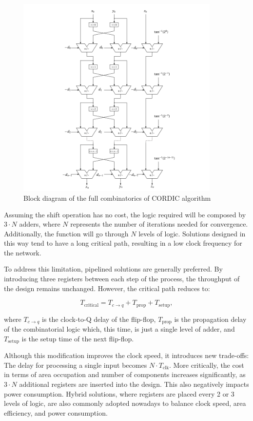 \begin{figure}[H]
    \centering
    \includegraphics[width=0.9\textwidth]{images/Architecture/pipelined_CORDIC.pdf}
    \caption{Block diagram of the full combinatorics of CORDIC algorithm}
    \label{fig:pipeline_CORDIC}
\end{figure}

Assuming the shift operation has no cost, the logic required will be composed by \(3 \cdot N\) adders, where \(N\) represents the number of iterations needed for convergence. Additionally, the function will go through \(N\) levels of logic. Solutions designed in this way tend to have a long critical path, resulting in a low clock frequency for the network.

To address this limitation, pipelined solutions are generally preferred. By introducing three registers between each step of the process, the throughput of the design remains unchanged. However, the critical path reduces to:

\[
T_{\text{critical}} = T_{c \to q} + T_{\text{prop}} + T_{\text{setup}},
\]

where \(T_{c \to q}\) is the clock-to-Q delay of the flip-flop, \(T_{\text{prop}}\) is the propagation delay of the combinatorial logic which, this time, is just a single level of adder, and \(T_{\text{setup}}\) is the setup time of the next flip-flop.

Although this modification improves the clock speed, it introduces new trade-offs: The delay for processing a single input becomes \(N \cdot T_{\text{clk}}\). More critically, the cost in terms of area occupation and number of components increases significantly, as \(3 \cdot N\) additional registers are inserted into the design. This also negatively impacts power consumption. Hybrid solutions, where registers are placed every 2 or 3 levels of logic, are also commonly adopted nowadays to balance clock speed, area efficiency, and power consumption.

